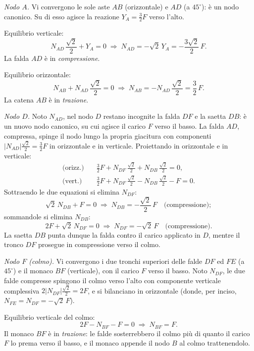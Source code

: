 \begin{esempio}
\begin{svolgimento}
		\textit{Nodo $A$.}
		Vi convergono le sole aste $AB$ (orizzontale) e
		$AD$ (a $45^\circ$): è un nodo canonico. Su di esso
		agisce la reazione $Y_A = \tfrac{3}{2}F$ verso l'alto.
		
		Equilibrio verticale:
		\[
		N_{AD}\,\frac{\sqrt2}{2} + Y_A = 0
		\;\Rightarrow\;
		N_{AD} = -\sqrt2\,Y_A
		= -\frac{3\sqrt2}{2}\,F.
		\]
		La falda $AD$ è in \emph{compressione}.
		
		Equilibrio orizzontale:
		\[
		N_{AB} + N_{AD}\,\frac{\sqrt2}{2} = 0
		\;\Rightarrow\;
		N_{AB} = -N_{AD}\,\frac{\sqrt2}{2}
		= \frac{3}{2}\,F.
		\]
		La catena $AB$ è in \emph{trazione}.
		
		\textit{Nodo $D$.}
		Noto $N_{AD}$, nel nodo $D$ restano incognite la
		falda $DF$ e la saetta $DB$: è un nuovo nodo canonico,
		su cui agisce il carico $F$ verso il basso. La falda
		$AD$, compressa, spinge il nodo lungo la propria
		giacitura con componenti
		$\lvert N_{AD}\rvert \tfrac{\sqrt2}{2} = \tfrac{3}{2}F$
		in orizzontale e in verticale. Proiettando in
		orizzontale e in verticale:
		\[
		\begin{aligned}
			\text{(orizz.)}\quad
			&\tfrac{3}{2}F + N_{DF}\,\tfrac{\sqrt2}{2}
			+ N_{DB}\,\tfrac{\sqrt2}{2} = 0,\\[2pt]
			\text{(vert.)}\quad
			&\tfrac{3}{2}F + N_{DF}\,\tfrac{\sqrt2}{2}
			- N_{DB}\,\tfrac{\sqrt2}{2} - F = 0.
		\end{aligned}
		\]
		Sottraendo le due equazioni si elimina $N_{DF}$:
		\[
		\sqrt2\,N_{DB} + F = 0
		\;\Rightarrow\;
		N_{DB} = -\frac{\sqrt2}{2}\,F
		\quad\text{(compressione)};
		\]
		sommandole si elimina $N_{DB}$:
		\[
		2F + \sqrt2\,N_{DF} = 0
		\;\Rightarrow\;
		N_{DF} = -\sqrt2\,F
		\quad\text{(compressione)}.
		\]
		La saetta $DB$ punta dunque la falda contro il carico
		applicato in $D$, mentre il tronco $DF$ prosegue in
		compressione verso il colmo.
		
		\textit{Nodo $F$ (colmo).}
		Vi convergono i due tronchi superiori delle falde
		$DF$ ed $FE$ (a $45^\circ$) e il monaco $BF$
		(verticale), con il carico $F$ verso il basso. Noto
		$N_{DF}$, le due falde compresse spingono il colmo
		verso l'alto con componente verticale complessiva
		$2 \lvert N_{DF}\rvert \tfrac{\sqrt2}{2} = 2F$, e si
		bilanciano in orizzontale (donde, per inciso,
		$N_{FE} = N_{DF} = -\sqrt2\,F$).
		
		Equilibrio verticale del colmo:
		\[
		2F - N_{BF} - F = 0
		\;\Rightarrow\;
		N_{BF} = F.
		\]
		Il monaco $BF$ è in \emph{trazione}: le falde
		sosterrebbero il colmo più di quanto il carico $F$
		lo prema verso il basso, e il monaco appende il nodo
		$B$ al colmo trattenendolo.
		

\end{svolgimento}
\end{esempio}
